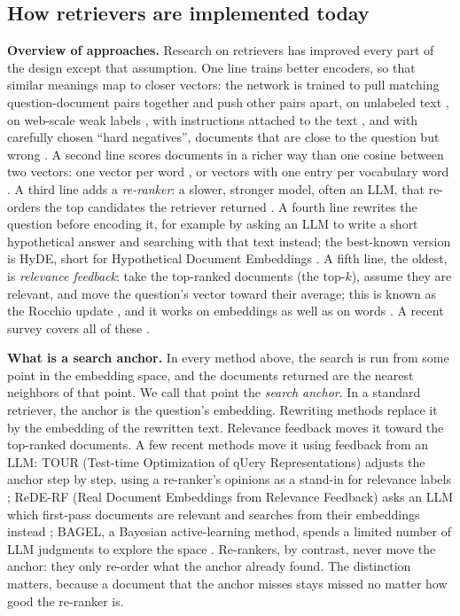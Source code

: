 \documentclass[12pt,a4paper]{article}
\begin{document}
\subsection{How retrievers are implemented today}

\textbf{Overview of approaches.} Research on retrievers has improved every part of the design except that assumption. One line trains better encoders, so that similar meanings map to closer vectors: the network is trained to pull matching question-document pairs together and push other pairs apart, on unlabeled text \citep{izacard2022contriever}, on web-scale weak labels \citep{wang2022e5}, with instructions attached to the text \citep{su2023instructor}, and with carefully chosen ``hard negatives'', documents that are close to the question but wrong \citep{qu2021rocketqa,xiong2021ance}. A second line scores documents in a richer way than one cosine between two vectors: one vector per word \citep{khattab2020colbert}, or vectors with one entry per vocabulary word \citep{formal2021splade}. A third line adds a \emph{re-ranker}: a slower, stronger model, often an LLM, that re-orders the top candidates the retriever returned \citep{nogueira2020monot5,sun2023rankgpt}. A fourth line rewrites the question before encoding it, for example by asking an LLM to write a short hypothetical answer and searching with that text instead; the best-known version is HyDE, short for Hypothetical Document Embeddings \citep{wang2023query2doc,gao2023hyde}. A fifth line, the oldest, is \emph{relevance feedback}: take the top-ranked documents (the top-$k$), assume they are relevant, and move the question's vector toward their average; this is known as the Rocchio update \citep{rocchio1971relevance}, and it works on embeddings as well as on words \citep{li2023vectorprf}. A recent survey covers all of these \citep{zhao2024densesurvey}.

\textbf{What is a search anchor.} In every method above, the search is run from some point in the embedding space, and the documents returned are the nearest neighbors of that point. We call that point the \emph{search anchor}. In a standard retriever, the anchor is the question's embedding. Rewriting methods replace it by the embedding of the rewritten text. Relevance feedback moves it toward the top-ranked documents. A few recent methods move it using feedback from an LLM: TOUR (Test-time Optimization of qUery Representations) adjusts the anchor step by step, using a re-ranker's opinions as a stand-in for relevance labels \citep{sung2023tour}; ReDE-RF (Real Document Embeddings from Relevance Feedback) asks an LLM which first-pass documents are relevant and searches from their embeddings instead \citep{jataria2024rederf}; BAGEL, a Bayesian active-learning method, spends a limited number of LLM judgments to explore the space \citep{bagel2026}. Re-rankers, by contrast, never move the anchor: they only re-order what the anchor already found. The distinction matters, because a document that the anchor misses stays missed no matter how good the re-ranker is.
\end{document}
